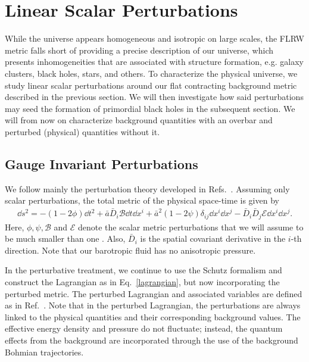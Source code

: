 \documentclass[a4paper,11pt]{article}
\begin{document}
\section{Linear Scalar Perturbations}
\label{linearpert}
While the universe appears homogeneous and isotropic on large scales, the FLRW metric falls short of providing a precise description of our universe, which presents inhomogeneities that are associated with structure formation, e.g. galaxy clusters, black holes, stars, and others. To characterize the physical universe, we study linear scalar perturbations around our flat contracting background metric described in the previous section. We will then investigate how said perturbations may seed the formation of primordial black holes in the subsequent section. We will from now on characterize background quantities with an overbar and perturbed (physical) quantities without it.

\subsection{Gauge Invariant Perturbations}

We follow mainly the perturbation theory developed in Refs.~\cite{covariant_bardeen,
	Vitenti2012}. Assuming only scalar perturbations, the total metric of the physical
space-time is given by
\begin{align}
	\label{physmetric-pert}
	\dd s^2 = -(1- 2 \phi)\dd t^2 + \bar{a}\bar{D}_i \mathcal{B} \dd t \dd x^i +
	\bar{a}^2(1-2 \psi)\delta_{ij}\dd x^i \dd x^j - \bar{D}_i\bar{D}_j \mathcal{E} \dd x^i \dd x^j
	.\end{align}
Here, $\phi, \psi, \mathcal{B}$ and $\mathcal{E}$ denote the scalar metric perturbations
that we will assume to be much smaller than one \cite{vitenti2012large}. Also,
$\bar{D}_i$ is the spatial covariant derivative in the $i$-th direction. Note that our
barotropic fluid has no anisotropic pressure.

	{\color{red} In the perturbative treatment, we continue to use the Schutz formalism
		and construct the Lagrangian as in Eq.~\eqref{lagrangian}, but now incorporating the
		perturbed metric. The perturbed Lagrangian and associated variables are defined as
		in Ref.~\cite{Vitenti2012}. Note that in the perturbed Lagrangian, the perturbations
		are always linked to the physical quantities and their corresponding background
		values. The effective energy density and pressure do not fluctuate; instead, the
		quantum effects from the background are incorporated through the use of the
		background Bohmian trajectories.}
\end{document}
